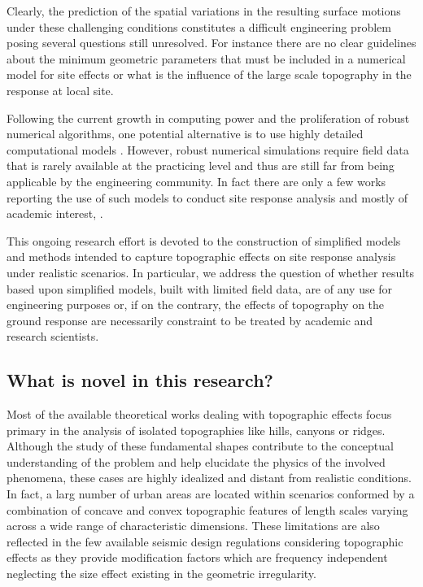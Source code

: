 \documentclass[11pt,letterpaper]{article}
\begin{document}
Clearly, the prediction of the spatial variations in the resulting surface motions under these challenging conditions constitutes a difficult engineering problem posing several questions still unresolved. For instance there are no clear guidelines about the minimum geometric parameters that must be included in a numerical model for site effects or what is the influence of the large scale topography in the response at local site.

Following the current growth in computing power and the proliferation of robust numerical algorithms, one potential alternative is to use highly detailed computational models \citep{Akcelik2003, Bielak2005, bielak2003, restrepo2012three, restrepo2016effects, Taborda2013, Taborda2011}. However, robust numerical simulations require field data that is rarely available at the practicing level and thus are still far from being applicable by the engineering community. In fact there are only a few works reporting the use of such models to conduct site response analysis and mostly of academic interest, \citep{makra2016site, assimaki2004topography}.

This ongoing research effort is devoted to the construction of simplified models and methods intended to capture topographic effects on site response analysis under realistic scenarios.  In particular, we address the question of whether results based upon simplified models, built with limited field data, are of any use for engineering purposes or, if on the contrary, the effects of topography on the ground response are necessarily constraint to be treated by academic and research scientists.

\subsection*{What is novel in this research?}

Most of the available theoretical works dealing with topographic effects focus primary in the analysis of isolated topographies like hills, canyons or ridges. Although the study of these fundamental shapes contribute to the conceptual understanding of the problem and help elucidate the physics of the involved phenomena, these cases are highly idealized and distant from realistic conditions. In fact, a larg number of urban areas are located within scenarios conformed by a combination of concave and convex topographic features of length scales varying across a wide range of characteristic dimensions. These limitations are also reflected in the few available seismic design regulations considering topographic effects as they provide modification factors which are frequency independent neglecting the size effect existing in the geometric irregularity.
\end{document}
